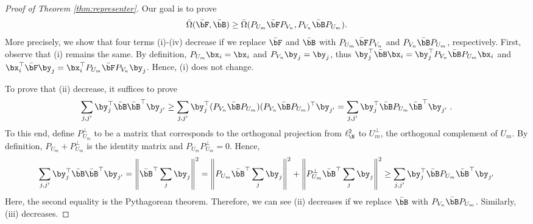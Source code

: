 \documentclass[11pt]{article}
\begin{document}
\begin{proof}[Proof of Theorem \ref{thm:representer}]
	Our goal is to prove
	\begin{equation*}
		\bar{\Omega}(\bar{\bF}, \bar{\bB})
		\ge
		\bar{\Omega}(P_{U_m} \bar{\bF} P_{V_n}, P_{V_n} \bar{\bB} P_{U_m}).
	\end{equation*}
	More precisely, we show that four terms (i)-(iv) decrease if we replace $\bar{\bF}$ and $\bar{\bB}$ with $P_{U_m} \bar{\bF} P_{V_n}$ and $P_{V_n} \bar{\bB} P_{U_m}$, respectively. First, observe that (i) remains the same. By definition, $P_{U_m} \bx_i = \bx_i$ and $P_{V_n} \by_j = \by_j$, thus $\by_j^\top \bar{\bB} \bx_i = \by_j^\top P_{V_n} \bar{\bB} P_{U_m} \bx_i$ and $\bx_i^\top \bar{\bF} \by_j = \bx_i^\top P_{U_m} \bar{\bF} P_{V_n} \by_j$. Hence, (i) does not change.

	To prove that (ii) decrease, it suffices to prove
	\begin{equation*}
		\sum_{j, j'} \by_{j}^\top \bar{\bB} \bar{\bB}^\top \by_{j'} 
		\ge
		\sum_{j, j'} \by_{j}^\top (P_{V_n} \bar{\bB} P_{U_m}) (P_{V_n} \bar{\bB} P_{U_m})^\top \by_{j'}
		=
		\sum_{j, j'} \by_{j}^\top \bar{\bB} P_{U_m} \bar{\bB}^\top \by_{j'} \;.
	\end{equation*}
	To this end, define $P_{U_m}^\perp$ to be a matrix that corresponds to the orthogonal projection from $\ell^2_{\N}$ to $U_m^\perp$, the orthogonal complement of $U_m$. By definition, $P_{U_m} + P_{U_m}^\perp$ is the identity matrix and $P_{U_m} P_{U_m}^\perp = 0$. Hence,
	\begin{equation*}
		\sum_{j, j'} \by_{j}^\top \bar{\bB} \bar{\bB}^\top \by_{j'} 
		=
		\left\|\bar{\bB}^\top \sum_{j} \by_{j}\right\|^2
		=
		\left\|P_{U_m} \bar{\bB}^\top \sum_{j} \by_{j}\right\|^2 + \left\|P_{U_m}^\perp \bar{\bB}^\top \sum_{j} \by_{j}\right\|^2
		\ge
		\sum_{j, j'} \by_{j}^\top \bar{\bB} P_{U_m} \bar{\bB}^\top \by_{j'}
	\end{equation*}
	Here, the second equality is the Pythagorean theorem. Therefore, we can see (ii) decreases if we replace $\bar{\bB}$ with $P_{V_n} \bar{\bB} P_{U_m}$. Similarly, (iii) decreases.


\end{proof}
\end{document}
